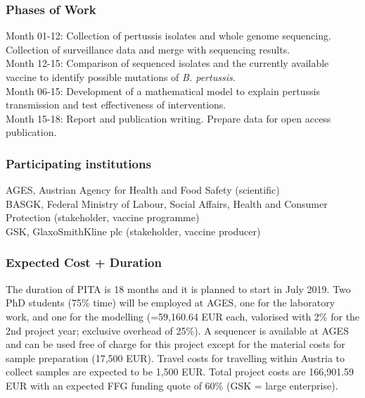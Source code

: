\documentclass[10pt,a4paper]{article}\usepackage[]{graphicx}\usepackage[]{color}
\begin{document}
\subsubsection*{Phases of Work}
Month 01-12: Collection of pertussis isolates and whole genome sequencing. Collection of surveillance data and merge with sequencing results.\\
Month 12-15: Comparison of sequenced isolates and the currently available vaccine to identify possible mutations of \textit{B. pertussis}.\\
Month 06-15: Development of a mathematical model to explain pertussis transmission and test effectiveness of interventions.\\
Month 15-18: Report and publication writing. Prepare data for open access publication.

\subsubsection*{Participating institutions}
AGES, Austrian Agency for Health and Food Safety (scientific)\\
BASGK, Federal Ministry of Labour, Social Affairs, Health and Consumer Protection (stakeholder, vaccine programme)\\
GSK, GlaxoSmithKline plc (stakeholder, vaccine producer)

\subsubsection*{Expected Cost + Duration}
The duration of PITA is 18 months and it is planned to start in July 2019. Two PhD students (75\% time) will be employed at AGES, one for the laboratory work, and one for the modelling (=59,160.64 EUR each, valorised with 2\% for the 2nd project year; exclusive overhead of 25\%). A sequencer is available at AGES and can be used free of charge for this project except for the material costs for sample preparation (17,500 EUR). Travel costs for travelling within Austria to collect samples are expected to be 1,500 EUR. Total project costs are 166,901.59 EUR with an expected FFG funding quote of 60\% (GSK = large enterprise).
\end{document}
